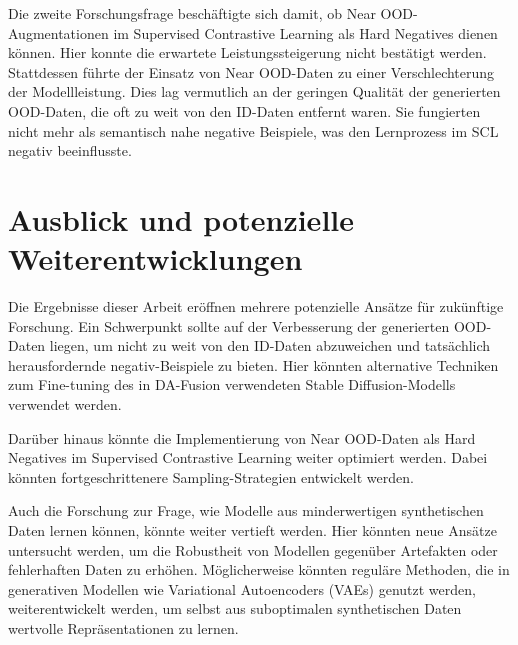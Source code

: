 Die zweite Forschungsfrage beschäftigte sich damit, ob Near OOD-Augmentationen im Supervised Contrastive Learning als Hard Negatives dienen können. Hier konnte die erwartete Leistungssteigerung nicht bestätigt werden. Stattdessen führte der Einsatz von Near OOD-Daten zu einer Verschlechterung der Modellleistung. Dies lag vermutlich an der geringen Qualität der generierten OOD-Daten, die oft zu weit von den ID-Daten entfernt waren. Sie fungierten nicht mehr als semantisch nahe negative Beispiele, was den Lernprozess im SCL negativ beeinflusste.

\section{Ausblick und potenzielle Weiterentwicklungen} \label{sec:outlook}

Die Ergebnisse dieser Arbeit eröffnen mehrere potenzielle Ansätze für zukünftige Forschung. Ein Schwerpunkt sollte auf der Verbesserung der generierten OOD-Daten liegen, um nicht zu weit von den ID-Daten abzuweichen und tatsächlich herausfordernde negativ-Beispiele zu bieten. Hier könnten alternative Techniken zum Fine-tuning des in DA-Fusion verwendeten Stable Diffusion-Modells verwendet werden.

Darüber hinaus könnte die Implementierung von Near OOD-Daten als Hard Negatives im Supervised Contrastive Learning weiter optimiert werden. Dabei könnten fortgeschrittenere Sampling-Strategien entwickelt werden. 

Auch die Forschung zur Frage, wie Modelle aus minderwertigen synthetischen Daten lernen können, könnte weiter vertieft werden. Hier könnten neue Ansätze untersucht werden, um die Robustheit von Modellen gegenüber Artefakten oder fehlerhaften Daten zu erhöhen. Möglicherweise könnten reguläre Methoden, die in generativen Modellen wie Variational Autoencoders (VAEs) genutzt werden, weiterentwickelt werden, um selbst aus suboptimalen synthetischen Daten wertvolle Repräsentationen zu lernen.